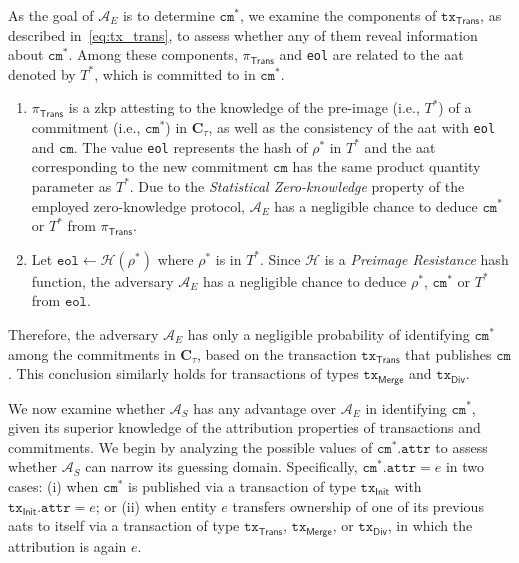 As the goal of \( \mathcal{A}_E \) is to determine \( \texttt{cm}^* \), we examine the components of \( \texttt{tx}_\mathsf{Trans} \), as described in~\eqref{eq:tx_trans}, to assess whether any of them reveal information about \( \texttt{cm}^* \). Among these components, \( \pi_{\mathsf{Trans}} \) and \texttt{eol} are related to the \gls{aat} denoted by \( T^* \), which is committed to in \( \texttt{cm}^*\).
\begin{enumerate}
	\item \( \pi_{\mathsf{Trans}} \) is a \gls{zkp} attesting to the knowledge of the pre-image (i.e., \( T^* \)) of a commitment (i.e., \( \texttt{cm}^* \)) in \( \mathbf{C}_\tau \), as well as the consistency of the \gls{aat} with \texttt{eol} and  \( \texttt{cm} \). The value \texttt{eol} represents the hash of \( \rho^* \) in \( T^* \) and the \gls{aat} corresponding to the  new commitment \( \texttt{cm} \) has the same product quantity parameter as  \( T^* \). Due to the \textit{Statistical Zero-knowledge} property of the employed zero-knowledge protocol, $\mathcal{A}_E$ has a negligible chance to deduce \( \texttt{cm}^* \) or \( T^* \) from $\pi_{\mathsf{Trans}}$.
	\item Let $\texttt{eol} \leftarrow \mathcal{H}(\rho^*)$ where $\rho^*$ is in $T^*$. Since $\mathcal{H}$ is a \textit{Preimage Resistance} hash function, the adversary $\mathcal{A}_E$ has a negligible chance to deduce $\rho^*$, \( \texttt{cm}^* \) or \( T^* \) from $\texttt{eol}$. 
\end{enumerate}
Therefore, the adversary \( \mathcal{A}_E \) has only a negligible probability of identifying \( \texttt{cm}^* \) among the commitments in \( \mathbf{C}_\tau \), based on the transaction \( \texttt{tx}_\mathsf{Trans} \) that publishes \( \texttt{cm} \). This conclusion similarly holds for transactions of types \( \texttt{tx}_\mathsf{Merge} \) and \( \texttt{tx}_\mathsf{Div} \).



We now examine whether \( \mathcal{A}_S \) has any advantage over \( \mathcal{A}_E \) in identifying \( \texttt{cm}^* \), given its superior knowledge of the attribution properties of transactions and commitments. We begin by analyzing the possible values of \( \texttt{cm}^*.\texttt{attr} \) to assess whether \( \mathcal{A}_S \) can narrow its guessing domain. Specifically, \( \texttt{cm}^*.\texttt{attr} = e \) in two cases: (i) when \( \texttt{cm}^* \) is published via a transaction of type \( \texttt{tx}_\mathsf{Init} \) with \( \texttt{tx}_\mathsf{Init}.\texttt{attr} = e \); or (ii) when entity \( e \) transfers ownership of one of its previous \glspl{aat} to itself via a transaction of type \( \texttt{tx}_\mathsf{Trans} \), \( \texttt{tx}_\mathsf{Merge} \), or \( \texttt{tx}_\mathsf{Div} \), in which the attribution is again \( e \). 

